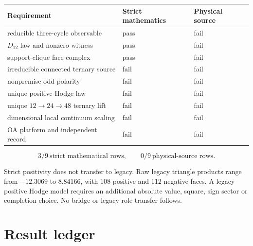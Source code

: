 \documentclass[11pt,a4paper]{article}
\begin{document}
\begin{longtable}{@{}p{}p{}p{}@{}}
\toprule
Requirement & Strict mathematics & Physical source \\
\midrule\endhead
reducible three-cycle observable & pass & fail \\
\(D_{12}\) law and nonzero witness & pass & fail \\
support-clique face complex & pass & fail \\
irreducible connected ternary source & fail & fail \\
nonpremise odd polarity & fail & fail \\
unique positive Hodge law & fail & fail \\
unique \(12\to24\to48\) ternary lift & fail & fail \\
dimensional local continuum scaling & fail & fail \\
OA platform and independent record & fail & fail \\
\bottomrule
\end{longtable}

\[
 \boxed{3/9\ \text{strict mathematical rows},\qquad
        0/9\ \text{physical-source rows}.}
\]

Strict positivity does not transfer to legacy.  Raw legacy triangle products
range from \(-12.3069\) to \(8.84166\), with 108 positive and 112 negative
faces.  A legacy positive Hodge model requires an additional absolute value,
square, sign sector or completion choice.  No bridge or legacy role transfer
follows.

\section{Result ledger}
\end{document}
